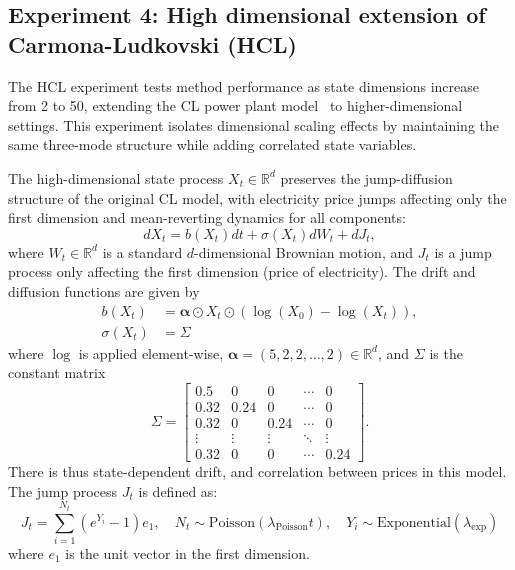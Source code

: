 \documentclass[11pt,reqno,a4paper]{amsart}
\theoremstyle{definition}
\numberwithin{equation}{section}
\DeclareMathOperator{\1}{\mathbbm{1}}
\begin{document}
\subsection{Experiment 4: High dimensional extension of Carmona-Ludkovski (HCL)}\label{sec:numerical:carmona_dim}

The HCL experiment tests method performance as state dimensions increase from 2 to 50, extending the CL power plant model~\cite{bayraktar2023neural} to higher-dimensional settings. This experiment isolates dimensional scaling effects by maintaining the same three-mode structure while adding correlated state variables.

The high-dimensional state process $X_t \in \mathbb{R}^d$ preserves the jump-diffusion structure of the original CL model, with electricity price jumps affecting only the first dimension and mean-reverting dynamics for all components:
\begin{equation}
  dX_t = b(X_t) dt + \sigma(X_t) dW_t + dJ_t,
\end{equation}
where $W_t \in \mathbb{R}^d$ is a standard $d$-dimensional Brownian motion, and $J_t$ is a jump process only affecting the first dimension (price of electricity). The drift and diffusion functions are given by
\begin{align}
  b(X_t)    & = \boldsymbol{\alpha} \odot X_t \odot (\log(X_0) - \log(X_t)), \\
  \sigma(X_t) & = \Sigma
\end{align}
where $\log$ is applied element-wise,  $\boldsymbol{\alpha} = (5, 2, 2, \ldots, 2) \in \mathbb{R}^d$, and $\Sigma$ is the constant matrix
\begin{equation}
  \Sigma =
  \begin{bmatrix}
    0.5    & 0      & 0      & \cdots & 0      \\
    0.32   & 0.24   & 0      & \cdots & 0      \\
    0.32   & 0      & 0.24   & \cdots & 0      \\
    \vdots & \vdots & \vdots & \ddots & \vdots \\
    0.32   & 0      & 0      & \cdots & 0.24
  \end{bmatrix}.
\end{equation}
There is thus state-dependent drift, and correlation between prices in this model.
The jump process $J_t$ is defined as:
\begin{equation}
  J_t = \sum_{i=1}^{N_t} (e^{Y_i} - 1)e_1, \quad N_t \sim \text{Poisson}(\lambda_\text{Poisson} t), \quad Y_i \sim \text{Exponential}(\lambda_\text{exp})
\end{equation}
where $e_1$ is the unit vector in the first dimension.
\end{document}

